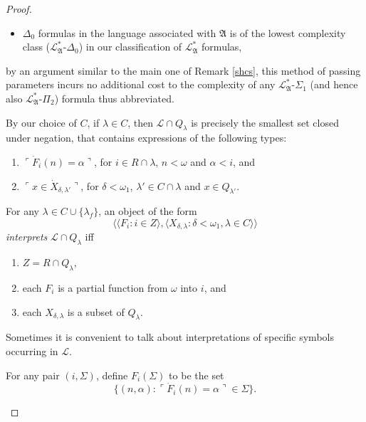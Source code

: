 \documentclass[12pt]{article}
\numberwithin{equation}{section}
\begin{document}
\begin{proof}
\begin{rem}
\begin{itemize}
    \item $\Delta_0$ formulas in the language associated with $\mathfrak{A}$ is of the lowest complexity class ($\mathcal{L}^{*}_{\mathfrak{A}}$-$\Delta_0$) in our classification of $\mathcal{L}^{*}_{\mathfrak{A}}$ formulas,
\end{itemize} 
by an argument similar to the main one of Remark \ref{shcs}, this method of passing parameters incurs no additional cost to the complexity of any $\mathcal{L}^{*}_{\mathfrak{A}}$-$\Sigma_1$ (and hence also $\mathcal{L}^{*}_{\mathfrak{A}}$-$\Pi_2$) formula thus abbreviated.
\end{rem}

By our choice of $C$, if $\lambda \in C$, then $\mathcal{L} \cap Q_{\lambda}$ is precisely the smallest set closed under negation, that contains expressions of the following types: 
\begin{enumerate}[label=(L\arabic*)$_{\lambda}$, leftmargin=45pt]
    \item\label{l1lamb} $\ulcorner \dot{F}_i (n) = \alpha \urcorner$, for $i \in R \cap \lambda$, $n < \omega$ and $\alpha < i$, and
    \item\label{l2lamb} $\ulcorner x \in \dot{X}_{\delta, \lambda'} \urcorner$, for $\delta < \omega_1$, $\lambda' \in C \cap \lambda$ and $x \in Q_{\lambda'}$.
\end{enumerate}

\begin{defi}\label{def412}
For any $\lambda \in C \cup \{\lambda_f\}$, an object of the form $$\langle \langle F_i : i \in Z \rangle, \langle X_{\delta, \lambda} : \delta < \omega_1, \lambda \in C \rangle \rangle$$ \emph{interprets} $\mathcal{L} \cap Q_{\lambda}$ iff 
\begin{enumerate}[label=(\alph*)]
    \item $Z = R \cap Q_{\lambda}$,
    \item each $F_i$ is a partial function from $\omega$ into $i$, and 
    \item each $X_{\delta, \lambda}$ is a subset of $Q_{\lambda}$. 
\end{enumerate}
\end{defi}

Sometimes it is convenient to talk about interpretations of specific symbols occurring in $\mathcal{L}$.

\begin{defi}
For any pair $(i, \Sigma)$, define $F_i(\Sigma)$ to be the set $$\{(n, \alpha) : \ulcorner \dot{F}_i(n) = \alpha \urcorner \in \Sigma\}.$$
\end{defi}


\end{proof}
\end{document}
